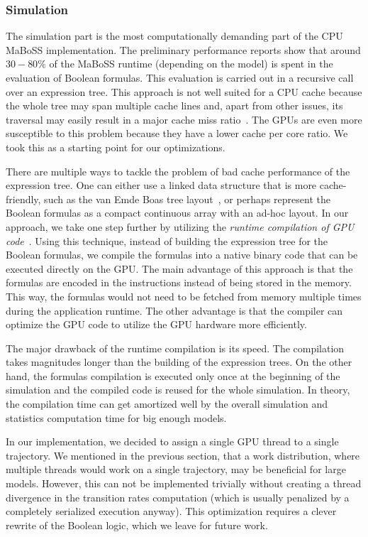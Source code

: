 \documentclass[times, twoside]{zHenriquesLab-StyleBioRxiv}
\begin{document}
\subsubsection*{Simulation}

The simulation part is the most computationally demanding part of the CPU MaBoSS implementation. The preliminary performance reports show that around $30-80\%$ of the MaBoSS runtime (depending on the model) is spent in the evaluation of Boolean formulas. This evaluation is carried out in a recursive call over an expression tree. This approach is not well suited for a CPU cache because the whole tree may span multiple cache lines and, apart from other issues, its traversal may easily result in a major cache miss ratio~\cite{karlsson2000prefetching}. The GPUs are even more susceptible to this problem because they have a lower cache per core ratio. We took this as a starting point for our optimizations.

There are multiple ways to tackle the problem of bad cache performance of the expression tree. One can either use a linked data structure that is more cache-friendly, such as the van Emde Boas tree layout~\cite{van1975preserving}, or perhaps represent the Boolean formulas as a compact continuous array with an ad-hoc layout. In our approach, we take one step further by utilizing the \emph{runtime compilation of GPU code}~\cite{nvrtc}. Using this technique, instead of building the expression tree for the Boolean formulas, we compile the formulas into a native binary code that can be executed directly on the GPU. The main advantage of this approach is that the formulas are encoded in the instructions instead of being stored in the memory. This way, the formulas would not need to be fetched from memory multiple times during the application runtime. The other advantage is that the compiler can optimize the GPU code to utilize the GPU hardware more efficiently. 

The major drawback of the runtime compilation is its speed. The compilation takes magnitudes longer than the building of the expression trees. On the other hand, the formulas compilation is executed only once at the beginning of the simulation and the compiled code is reused for the whole simulation. In theory, the compilation time can get amortized well by the overall simulation and statistics computation time for big enough models.

In our implementation, we decided to assign a single GPU thread to a single trajectory. We mentioned in the previous section, that a work distribution, where multiple threads would work on a single trajectory, may be beneficial for large models. However, this can not be implemented trivially without creating a thread divergence in the transition rates computation (which is usually penalized by a completely serialized execution anyway). This optimization requires a clever rewrite of the Boolean logic, which we leave for future work.
\end{document}
